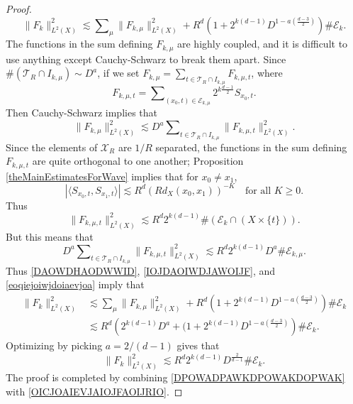 \begin{proof}
    \begin{equation} \label{DAOWDHAODWWID}
        \| F_k \|_{L^2(X)}^2 \lesssim \sum\nolimits_\mu \| F_{k,\mu} \|_{L^2(X)}^2 + R^{d} \left( 1 + 2^{k(d-1)} D^{1 - a \left( \frac{d-3}{2} \right)} \right) \# \mathcal{E}_k.
    \end{equation}
%
The functions in the sum defining $F_{k,\mu}$ are highly coupled, and it is difficult to use anything except Cauchy-Schwarz to break them apart. Since $\# ( \mathcal{T}_R \cap I_{k,\mu}) \sim D^a$, if we set $F_{k,\mu} = \sum_{t \in \mathcal{T}_R \cap I_{k,\mu}} F_{k,\mu,t}$, where
%
\begin{equation}
    F_{k,\mu,t} = \sum\nolimits_{(x_0,t) \in \mathcal{E}_{k,\mu}} 2^{k \frac{d-1}{2}} {S\!}_{x_0,t}.
\end{equation}
%
Then Cauchy-Schwarz implies that
%
\begin{equation} \label{IOJDAOIWDJAWOIJF}
    \| F_{k,\mu} \|_{L^2(X)}^2 \lesssim D^a \sum\nolimits_{t \in \mathcal{T}_R \cap I_{k,\mu}} \| F_{k,\mu,t} \|_{L^2(X)}^2.
\end{equation}
%
Since the elements of $\mathcal{X}_R$ are $1/R$ separated, the functions in the sum defining $F_{k,\mu,t}$ are quite orthogonal to one another; Proposition \ref{theMainEstimatesForWave} implies that for $x_0 \neq x_1$,
%
\begin{equation}
    |\langle {S\!}_{x_0,t}, {S\!}_{x_1,t} \rangle| \lesssim R^d ( R d_X(x_0,x_1) )^{-K} \quad\text{for all $K \geq 0$}.
\end{equation}
%
Thus
%
\begin{equation}
    \| F_{k,\mu,t} \|_{L^2(X)}^2 \lesssim R^{d} 2^{k(d-1)} \# (\mathcal{E}_k \cap (X \times \{ t \})).
\end{equation}
%
But this means that
%
\begin{equation} \label{eoqiejoiwjdoiaevjoa}
    D^a \sum\nolimits_{t \in \mathcal{T}_R \cap I_{k,\mu}} \| F_{k,\mu,t} \|_{L^2(X)}^2 \lesssim R^{d} 2^{k(d-1)} D^a \# \mathcal{E}_{k,\mu}.
\end{equation}
%
Thus \eqref{DAOWDHAODWWID}, \eqref{IOJDAOIWDJAWOIJF}, and \eqref{eoqiejoiwjdoiaevjoa} imply that
%
\begin{equation}
\begin{split}
    \| F_k \|_{L^2(X)}^2 &\lesssim \sum\nolimits_\mu \| F_{k,\mu} \|_{L^2(X)}^2 + R^{d} \left( 1 + 2^{k(d-1)} D^{1 - a \left( \frac{d-3}{2} \right)} \right) \# \mathcal{E}_k\\
    &\lesssim R^{d} \left( 2^{k(d-1)} D^a + (1 + 2^{k(d-1)} D^{1 - a \left( \frac{d-3}{2} \right)} \right) \# \mathcal{E}_k.
\end{split}
\end{equation}
%
Optimizing by picking $a = 2 / (d-1)$ gives that
%
\begin{equation} \label{OICJOAIEVJAIOJFAOIJRIO}
    \| F_k \|_{L^2(X)}^2 \lesssim R^{d} 2^{k(d-1)} D^{\frac{2}{d-1}} \# \mathcal{E}_k.
\end{equation}
%
The proof is completed by combining \eqref{DPOWADPAWKDPOWAKDOPWAK} with \eqref{OICJOAIEVJAIOJFAOIJRIO}.
\end{proof}

